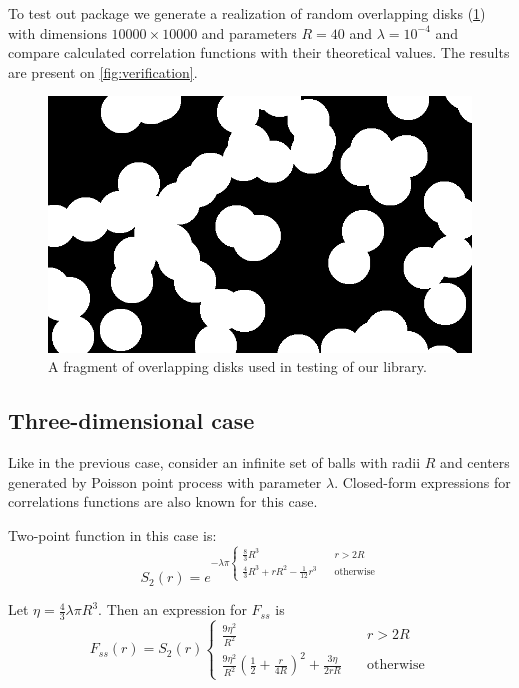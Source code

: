 \documentclass[reprint,amsmath,amssymb,aps,pre,showkeys,showpacs,nofootinbib]{revtex4-1}
\begin{document}
To test out package we generate a realization of random overlapping disks
(\cref{fig:overlapping-disks}) with dimensions $10000 \times 10000$ and
parameters $R = 40$ and $\lambda = 10^{-4}$ and compare calculated correlation
functions with their theoretical values. The results are present on
\cref{fig:verification}.
\begin{figure}[ht]
  \centering
  \includegraphics[width=0.9\linewidth]{images/disks-fragment.png}
  \caption[]{A fragment of overlapping disks used in testing of our library.}
  \label{fig:overlapping-disks}
\end{figure}

\subsection{Three-dimensional case}
Like in the previous case, consider an infinite set of balls with radii $R$ and
centers generated by Poisson point process with parameter $\lambda$. Closed-form
expressions for correlations functions are also known for this case.

Two-point function in this case is:
\begin{equation*}
  S_2(r) = e^{-\lambda\pi \left\{
  \begin{array}{ll}
    \frac{8}{3} R^3 & \quad r > 2R \\
    \frac{4}{3} R^3 + rR^2 - \frac{1}{12}r^3 & \quad \text{otherwise}
  \end{array}
  \right.}
\end{equation*}

Let $\eta = \frac{4}{3}\lambda \pi R^3$. Then an expression for $F_{ss}$ is
\begin{equation*}
  F_{ss}(r) = S_2(r) \left\{
  \begin{array}{ll}
    \frac{9\eta^2}{R^2} & \quad r > 2R \\
    \frac{9\eta^2}{R^2}(\frac{1}{2}+\frac{r}{4R})^2 + \frac{3\eta}{2rR} & \quad \text{otherwise}
  \end{array}
  \right.
\end{equation*}
\end{document}
